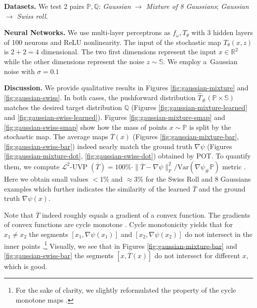 \documentclass{article} %
\begin{document}
\textbf{Datasets.} We test 2 pairs $\mathbb{P},\mathbb{Q}$: \textit{Gaussian} $\rightarrow$ \textit{Mixture of 8 Gaussians}; \textit{Gaussian} $\rightarrow$ \textit{Swiss roll}.

\textbf{Neural Networks.} We use multi-layer perceptrons as $f_{\omega}, T_{\theta}$ with 3 hidden layers of 100 neurons and ReLU nonlinearity. The input of the stochastic map $T_{\theta}(x,z)$ is $2+2=4$ dimensional. The two first dimensions represent the input $x\in\mathbb{R}^{2}$ while the other dimensions represent the noise $z\sim\mathbb{S}$. We employ a~Gaussian noise with $\sigma=0.1$

\textbf{Discussion.} We provide qualitative results in Figures \ref{fig:gaussian-mixture} and \ref{fig:gaussian-swiss}. In both cases, the pushforward distribution $\widehat{T}_{\#}(\mathbb{P}\times\mathbb{S})$ matches the desired target distribution $\mathbb{Q}$ (Figures \ref{fig:gaussian-mixture-learned} and \ref{fig:gaussian-swiss-learned}). Figures \ref{fig:gaussian-mixture-smap} and \ref{fig:gaussian-swiss-smap} show how the mass of points $x\sim\mathbb{P}$ is split by the stochastic map.
The average maps $\overline{T}(x)$  (Figures \ref{fig:gaussian-mixture-bar}, \ref{fig:gaussian-swiss-bar}) indeed nearly match the ground truth $\nabla\psi$ (Figures \ref{fig:gaussian-mixture-dot}, \ref{fig:gaussian-swiss-dot}) obtained by POT. To quantify them, we compute $\mathcal{L}^{2}$-UVP $(\overline{T})=100\%\cdot\|\overline{T}-\nabla\psi\|^{2}_{\mathbb{P}}/\mbox{Var}(\nabla\psi_{\#}\mathbb{P})$ metric \cite[]{korotin2019wasserstein}. Here we obtain small values $<1\%$ and $\approx 3\%$ for the Swiss Roll and 8 Gaussians examples which further indicates the similarity of the learned $\overline{T}$ and the ground truth $\nabla\psi(x)$.

Note that $\overline{T}$ indeed roughly equals a gradient of a convex function. The gradients of convex functions are cycle monotone \citep{rockafellar1966characterization}. Cycle monotonicity yields that for $x_{1}\neq x_{2}$ the segments $[x_{1},\nabla\psi (x_{1})]$ and $[x_{2},\nabla\psi (x_{2})]$ do not intersect in the inner points \citep[]{villani2008optimal}.\footnote{For the sake of clarity, we slightly reformulated the property of the cycle monotone maps \citep{villani2008optimal}.} Visually, we see that in Figures \ref{fig:gaussian-mixture-bar} and \ref{fig:gaussian-swiss-bar} the segments $[x,\overline{T}(x)]$ do not intersect for different $x$, which is good. 
\end{document}
